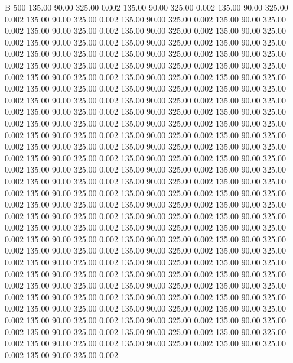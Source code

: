 


B    500
135.00  90.00  325.00 0.002
135.00  90.00  325.00 0.002
135.00  90.00  325.00 0.002
135.00  90.00  325.00 0.002
135.00  90.00  325.00 0.002
135.00  90.00  325.00 0.002
135.00  90.00  325.00 0.002
135.00  90.00  325.00 0.002
135.00  90.00  325.00 0.002
135.00  90.00  325.00 0.002
135.00  90.00  325.00 0.002
135.00  90.00  325.00 0.002
135.00  90.00  325.00 0.002
135.00  90.00  325.00 0.002
135.00  90.00  325.00 0.002
135.00  90.00  325.00 0.002
135.00  90.00  325.00 0.002
135.00  90.00  325.00 0.002
135.00  90.00  325.00 0.002
135.00  90.00  325.00 0.002
135.00  90.00  325.00 0.002
135.00  90.00  325.00 0.002
135.00  90.00  325.00 0.002
135.00  90.00  325.00 0.002
135.00  90.00  325.00 0.002
135.00  90.00  325.00 0.002
135.00  90.00  325.00 0.002
135.00  90.00  325.00 0.002
135.00  90.00  325.00 0.002
135.00  90.00  325.00 0.002
135.00  90.00  325.00 0.002
135.00  90.00  325.00 0.002
135.00  90.00  325.00 0.002
135.00  90.00  325.00 0.002
135.00  90.00  325.00 0.002
135.00  90.00  325.00 0.002
135.00  90.00  325.00 0.002
135.00  90.00  325.00 0.002
135.00  90.00  325.00 0.002
135.00  90.00  325.00 0.002
135.00  90.00  325.00 0.002
135.00  90.00  325.00 0.002
135.00  90.00  325.00 0.002
135.00  90.00  325.00 0.002
135.00  90.00  325.00 0.002
135.00  90.00  325.00 0.002
135.00  90.00  325.00 0.002
135.00  90.00  325.00 0.002
135.00  90.00  325.00 0.002
135.00  90.00  325.00 0.002
135.00  90.00  325.00 0.002
135.00  90.00  325.00 0.002
135.00  90.00  325.00 0.002
135.00  90.00  325.00 0.002
135.00  90.00  325.00 0.002
135.00  90.00  325.00 0.002
135.00  90.00  325.00 0.002
135.00  90.00  325.00 0.002
135.00  90.00  325.00 0.002
135.00  90.00  325.00 0.002
135.00  90.00  325.00 0.002
135.00  90.00  325.00 0.002
135.00  90.00  325.00 0.002
135.00  90.00  325.00 0.002
135.00  90.00  325.00 0.002
135.00  90.00  325.00 0.002
135.00  90.00  325.00 0.002
135.00  90.00  325.00 0.002
135.00  90.00  325.00 0.002
135.00  90.00  325.00 0.002
135.00  90.00  325.00 0.002
135.00  90.00  325.00 0.002
135.00  90.00  325.00 0.002
135.00  90.00  325.00 0.002
135.00  90.00  325.00 0.002
135.00  90.00  325.00 0.002
135.00  90.00  325.00 0.002
135.00  90.00  325.00 0.002
135.00  90.00  325.00 0.002
135.00  90.00  325.00 0.002
135.00  90.00  325.00 0.002
135.00  90.00  325.00 0.002
135.00  90.00  325.00 0.002
135.00  90.00  325.00 0.002
135.00  90.00  325.00 0.002
135.00  90.00  325.00 0.002
135.00  90.00  325.00 0.002
135.00  90.00  325.00 0.002
135.00  90.00  325.00 0.002
135.00  90.00  325.00 0.002
135.00  90.00  325.00 0.002
